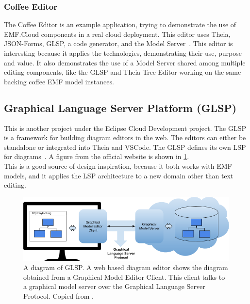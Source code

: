 \subsubsection{Coffee Editor}
The Coffee Editor is an example application, trying to demonstrate the use of EMF.Cloud components in a real \gls{cloud} deployment.
This editor uses \gls{Theia}, JSON-Forms, \acrshort{GLSP}, a code generator, and the Model Server~\cite{foundationEMFCloud}.
This editor is interesting because it applies the technologies, demonstrating their use, purpose and value.
It also demonstrates the use of a Model Server shared among multiple editing components, like the GLSP and Theia Tree Editor working on the same backing coffee \acrshort{EMF} model instances.

\subsection{Graphical Language Server Platform (GLSP)}\label{sec:glsp}

This is another project under the Eclipse Cloud Development project.
The \acrfull{GLSP} is a framework for building diagram editors in the web.
The editors can either be standalone or integrated into \gls{Theia} and \gls{VSCode}.
The \acrshort{GLSP} defines its own \acrfull{LSP} for diagrams~\cite{eclipsefoundationGLSP2020}.
A figure from the official website is shown in \cref{fig:glsp-overview}.\\

This is a good source of design inspiration, because it both works with \acrshort{EMF} models, and it applies the \acrlong{LSP} architecture to a new domain other than text editing.

\begin{figure}[htbp]  %
  \centering
  \includegraphics[width=\textwidth]{figures/pre-project/glsp-overview.png}
  \caption[GLSP Overview]{A diagram of GLSP. A web based diagram editor shows the diagram obtained from a Graphical Model Editor Client. This client talks to a graphical model server over the Graphical Language Server Protocol. Copied from \cite{eclipsefoundationGLSP2020}.}\label{fig:glsp-overview}
\end{figure}

